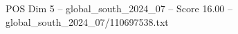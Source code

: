\begin{textsample}{POS Dim 5 – global\_south\_2024\_07 – Score 16.00 – global\_south\_2024\_07/110697538.txt}
\end{textsample}
